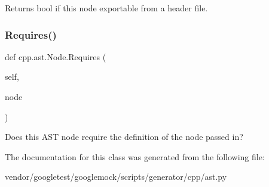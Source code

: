 \begin{DoxyVerb}Returns bool if this node exportable from a header file.\end{DoxyVerb}
 \mbox{\label{classcpp_1_1ast_1_1_node_a31ae211f954a8c578ef16226df5ac8c8}} 
\subsubsection{\texorpdfstring{Requires()}{Requires()}}
{\footnotesize\ttfamily def cpp.\+ast.\+Node.\+Requires (\begin{DoxyParamCaption}\item[{}]{self,  }\item[{}]{node }\end{DoxyParamCaption})}

\begin{DoxyVerb}Does this AST node require the definition of the node passed in?\end{DoxyVerb}
 

The documentation for this class was generated from the following file\+:\begin{DoxyCompactItemize}
\item 
vendor/googletest/googlemock/scripts/generator/cpp/ast.\+py\end{DoxyCompactItemize}
